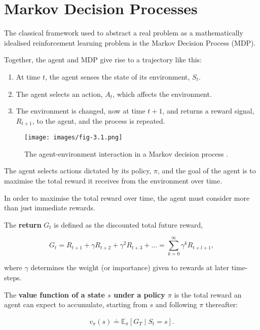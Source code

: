 \documentclass{article}
\begin{document}
\section{Markov Decision Processes}

The classical framework used to abstract a real problem as a mathematically idealised reinforcement learning problem is the Markov Decision Process (MDP).

Together, the agent and MDP give rise to a trajectory like this:

\begin{enumerate}
  \item{At time $t$, the agent senses the state of its environment, $S_t$.}
  \item{The agent selects an action, $A_t$, which affects the environment.}
  \item{The environment is changed, now at time $t+1$, and returns a reward signal, $R_{t+1}$, to the agent, and the process is repeated.}
\end{enumerate}

\begin{figure}[h]
  \centering
  \texttt{[image: images/fig-3.1.png]}
  \caption{The agent-environment interaction in a Markov decision process \cite{Sutton1998}.}
\end{figure}

The agent selects actions dictated by its policy, $\pi$, and the goal of the agent is to maximise the total reward it receives from the environment over time.

In order to maximise the total reward over time, the agent must consider more than just immediate rewards.

The \textbf{return} $G_t$ is defined as the discounted total future reward, 

\[ 
G_t = R_{t+1} + \gamma R_{t+2} + \gamma^2 R_{t+3} + \dots = \sum_{k=0}^{\infty} \gamma^k R_{t+l+1},
\]

where $\gamma$ determines the weight (or importance) given to rewards at later time-steps.

The \textbf{value function of a state $s$ under a policy $\pi$} is the total reward an agent can expect to accumulate, starting from $s$ and following $\pi$ thereafter:

\[
\begin{aligned}
v_\pi(s) \doteq \mathbb{E}_\pi \left[ G_T \middle| S_t = s \right].
\end{aligned}
\]
\end{document}
